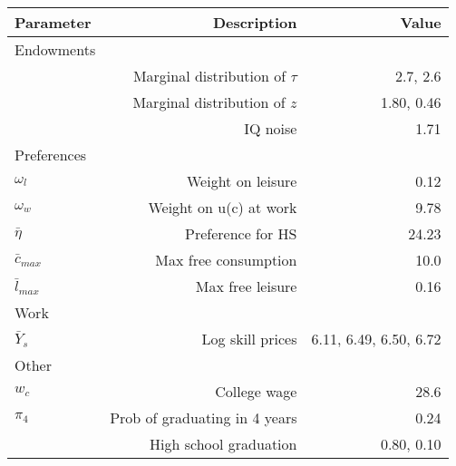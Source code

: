 \begin{tabular}{lrr}
\hline
Parameter & Description  & Value  \\ 
\hline
Endowments &   &   \\ 
 & Marginal distribution of $\tau$  & 2.7, 2.6  \\ 
 & Marginal distribution of $z$  & 1.80, 0.46  \\ 
 & IQ noise  & 1.71  \\ 
Preferences &   &   \\ 
$\omega_{l}$ & Weight on leisure  & 0.12  \\ 
$\omega_{w}$ & Weight on u(c) at work  & 9.78  \\ 
$\bar{\eta}$ & Preference for HS  & 24.23  \\ 
$\bar{c}_{max}$ & Max free consumption  & 10.0  \\ 
$\bar{l}_{max}$ & Max free leisure  & 0.16  \\ 
Work &   &   \\ 
$\bar{Y}_{s}$ & Log skill prices  & 6.11, 6.49, 6.50, 6.72  \\ 
Other &   &   \\ 
$w_{c}$ & College wage  & 28.6  \\ 
$\pi_{4}$ & Prob of graduating in 4 years  & 0.24  \\ 
 & High school graduation  & 0.80, 0.10  \\ 
\hline
\end{tabular}%

